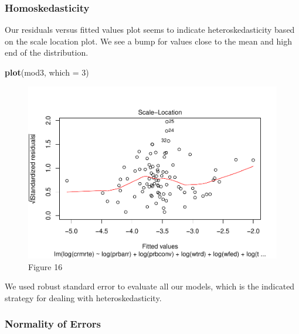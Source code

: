 \documentclass[]{article}
\newenvironment{Shaded}{\begin{snugshade}}{\end{snugshade}}
\newcommand{\DataTypeTok}[1]{\textcolor[rgb]{0.13,0.29,0.53}{#1}}
\newcommand{\DecValTok}[1]{\textcolor[rgb]{0.00,0.00,0.81}{#1}}
\newcommand{\KeywordTok}[1]{\textcolor[rgb]{0.13,0.29,0.53}{\textbf{#1}}}
\newcommand{\NormalTok}[1]{#1}
\begin{document}
\hypertarget{homoskedasticity}{%
\subsubsection{Homoskedasticity}\label{homoskedasticity}}

Our residuals versus fitted values plot seems to indicate
heteroskedasticity based on the scale location plot. We see a bump for
values close to the mean and high end of the distribution.

\begin{Shaded}
\begin{Highlighting}[]
\KeywordTok{plot}\NormalTok{(mod3, }\DataTypeTok{which =} \DecValTok{3}\NormalTok{)}
\end{Highlighting}
\end{Shaded}

\begin{figure}

{\centering \includegraphics{lab_3_v7_files/figure-latex/unnamed-chunk-48-1} 

}

\caption{Figure 16}\label{fig:unnamed-chunk-48}
\end{figure}

We used robust standard error to evaluate all our models, which is the
indicated strategy for dealing with heteroskedasticity.

\hypertarget{normality-of-errors}{%
\subsubsection{Normality of Errors}\label{normality-of-errors}}
\end{document}
